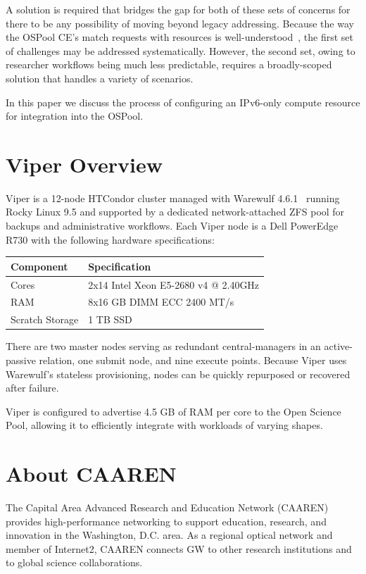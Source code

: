 \documentclass[11pt]{article}
\begin{document}
A solution is required that bridges the gap for both of these sets of concerns for there to be any possibility of moving beyond legacy addressing. Because the way the OSPool CE's match requests with resources is well-understood~\cite{ospooldocs}, the first set of challenges may be addressed systematically. However, the second set, owing to researcher workflows being much less predictable, requires a broadly-scoped solution that handles a variety of scenarios. 

In this paper we discuss the process of configuring an IPv6-only compute resource for integration into the OSPool.

\section{Viper Overview}

Viper is a 12-node HTCondor cluster managed with Warewulf 4.6.1~\cite{warewulf} running Rocky Linux 9.5 and supported by a dedicated network-attached ZFS pool for backups and administrative workflows.  Each Viper node is a Dell PowerEdge R730 with the following hardware specifications:

\begin{center}
\small
\begin{tabular}{|l|l|}
\hline
\textbf{Component} & \textbf{Specification} \\
\hline
Cores & 2x14 Intel Xeon E5-2680 v4 @ 2.40GHz\\
RAM & 8x16 GB DIMM ECC 2400 MT/s \\
Scratch Storage & 1 TB SSD \\
\hline
\end{tabular}
\end{center}
There  are two master nodes serving as redundant central-managers in an active-passive relation, one
submit node, and nine execute points. Because Viper uses Warewulf's stateless provisioning, nodes can be quickly repurposed or recovered after failure.

Viper is configured to advertise 4.5 GB of RAM per core to the Open Science Pool, allowing it to efficiently integrate with workloads of varying shapes.  

\section{About CAAREN}

The Capital Area Advanced Research and Education Network (CAAREN) provides high-performance networking to support education, research, and innovation in the Washington, D.C. area. As a regional optical network and member of Internet2, CAAREN connects GW to other research institutions and to global science collaborations.
\newline
\end{document}
